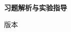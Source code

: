 \ifodd\value{page}\null\thispagestyle{empty}\newpage\fi
\thispagestyle{empty}
\vspace*{45mm}
\begin{center}{\LARGE\bfseries 习题解析与实验指导\par}
\vspace{12mm}
{\small \bookedition\quad 版本 \bookversion\par}
\end{center}
